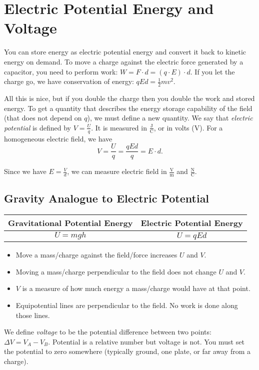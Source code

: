 \documentclass[class=article, crop=false]{standalone}
\begin{document}
  \section{Electric Potential Energy and Voltage}
  You can store energy as electric potential energy and convert it back to kinetic energy on demand. To move a charge against the electric force generated by a capacitor, you need to perform work: $W = F\cdot d = (q\cdot E)\cdot d$. If you let the charge go, we have conservation of energy: $qEd = \frac{1}{2}mv^2$. \par
  All this is nice, but if you double the charge then you double the work and stored energy. To get a quantity that describes the energy storage capability of the field (that does not depend on $q$), we must define a new quantity. We say that \emph{electric potential} is defined by $V = \frac{U}{q}$. It is measured in $\frac{\mathrm{J}}{\mathrm{C}}$, or in volts ($\mathrm{V}$). For a homogeneous electric field, we have
  \[
    V = \frac{U}{q} = \frac{qEd}{q} = E\cdot d.
  \]
  \begin{note}{}
    Since we have $E = \frac{V}{d}$, we can measure electric field in $\frac{\mathrm{V}}{\mathrm{m}}$ and $\frac{\mathrm{N}}{\mathrm{C}}$.
  \end{note}
  \subsection{Gravity Analogue to Electric Potential}
  \begin{center}\begin{tabular}{c|c}
    Gravitational Potential Energy & Electric Potential Energy \\
    \hline
    $U = mgh$ & $U = qEd$
  \end{tabular}\end{center}
  \begin{itemize}
    \item Move a mass/charge against the field/force increases $U$ and $V$.
    \item Moving a mass/charge perpendicular to the field does not change $U$ and $V$.
    \item $V$ is a measure of how much energy a mass/charge would have at that point.
    \item Equipotential lines are perpendicular to the field. No work is done along those lines.
  \end{itemize}
  We define \emph{voltage} to be the potential difference between two points: $\Delta V = V_A - V_B$. Potential is a relative number but voltage is not. You must set the potential to zero somewhere (typically ground, one plate, or far away from a charge).
\end{document}
